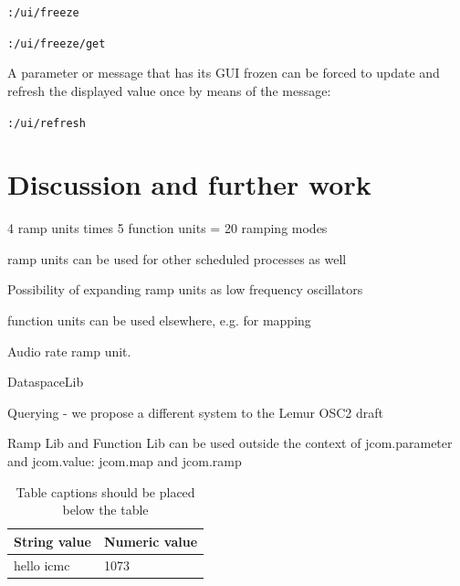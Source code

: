 \documentclass{article}
\begin{document}
\texttt{:/ui/freeze}

\texttt{:/ui/freeze/get}

A parameter or message that has its GUI frozen can be forced to update and refresh the displayed value once by means of the message:

\texttt{:/ui/refresh}





\section{Discussion and further work} %
\label{sec:discussion_and_further_work}

4 ramp units times 5 function units = 20 ramping modes

ramp units can be used for other scheduled processes as well

Possibility of expanding ramp units as low frequency oscillators

function units can be used elsewhere, e.g. for mapping

Audio rate ramp unit.

DataspaceLib

Querying - we propose a different system to the Lemur OSC2 draft

Ramp Lib and Function Lib can be used outside the context of jcom.parameter and jcom.value: jcom.map and jcom.ramp





\begin{table}
\begin{center}
\begin{tabular}{|l|l|}
\hline
String value & Numeric value \\
\hline
hello icmc  & 1073 \\
\hline
\end{tabular}
\end{center}
\caption{Table captions should be placed below the table}
\label{tab:example}
\end{table}
\end{document}
